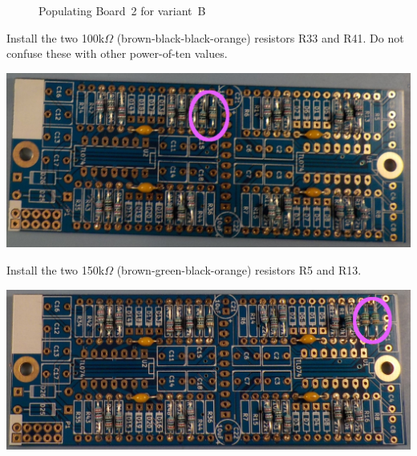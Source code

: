 \begin{figure}
\par
\caption{Populating Board~2 for variant~B}\label{fig:board-stuffing-2b}
\end{figure}

Install the two 100k$\Omega$ (brown-black-black-orange) resistors R33
and R41.  Do not confuse these with other power-of-ten values.

\noindent\includegraphics[width=\linewidth]{res-100kB.jpg}

Install the two 150k$\Omega$ (brown-green-black-orange) resistors R5
and R13.

\noindent\includegraphics[width=\linewidth]{res-150kB.jpg}

